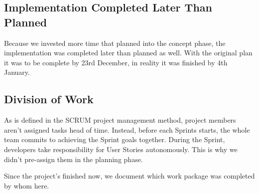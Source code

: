 \subsection{Implementation Completed Later Than Planned}\label{subsec:implementation-completed-later-than-planned}
Because we invested more time that planned into the concept phase,
the implementation was completed later than planned as well.
With the original plan it was to be complete by 23rd December, in reality it was finished by 4th January.

\subsection{Division of Work}\label{subsec:division-of-work}
As is defined in the SCRUM project management method,
project members aren't assigned tasks head of time.
Instead, before each Sprints starts, the whole team commits to achieving the Sprint goals together.
During the Sprint, developers take responsibility for User Stories autonomously.
This is why we didn't pre-assign them in the planning phase.

Since the project's finished now, we document which work package was completed by whom here.

